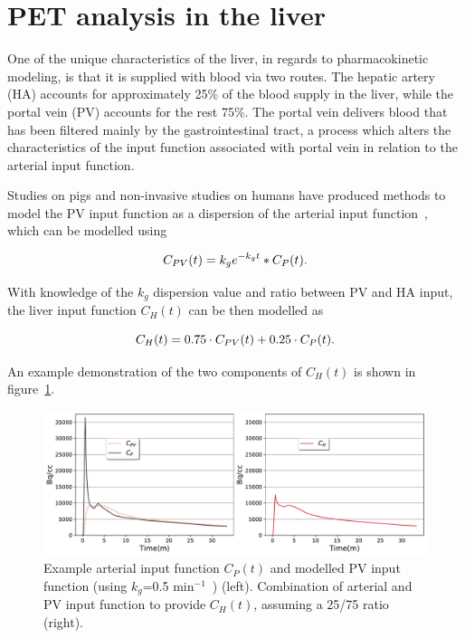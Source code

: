 \section{PET analysis in the liver}
\label{liver_PV_theory}
One of the unique characteristics of the liver, in regards to pharmacokinetic modeling, is that it is supplied with blood via two routes. The hepatic artery (HA) accounts for approximately 25\% of the blood supply in the liver, while the portal vein (PV) accounts for the rest 75\%. The portal vein delivers blood that has been filtered mainly by the gastrointestinal tract, a process which alters the characteristics of the input function associated with portal vein in relation to the arterial input function. 

Studies on pigs and non-invasive studies on humans have produced methods to model the PV input function as a dispersion of the arterial input function~\cite{Kudomi2008,Winterdahl2011}, which can be modelled using 

\begin{equation} 
{C_{PV}}(t)  = {k_g} e^{-k_g t} \ast C_P(t)   \\ . \\
\label{eqn:PortalVein}
\end{equation}

With knowledge of the $k_g$ dispersion value and ratio between PV and HA input, the liver input function ${C_{H}}(t)$ can be then modelled as

\begin{equation} 
{C_{H}}(t)  = 0.75 \cdot C_{PV}(t) + 0.25 \cdot C_{P}(t)  \\ . \\
\label{eqn:HepaticInput}
\end{equation}

An example demonstration of the two components of ${C_{H}}(t)$ is shown in figure~\ref{fig_2_2:LiverDualInputFunction}.

\begin{figure} [h!]
\centering
\includegraphics[scale=0.53,angle=0]{2_Theory_Methods/figures/2_2_LiverDualInputFunction.pdf}
\caption{Example arterial input function $C_{P}(t)$ and modelled PV input function (using $k_g$=0.5 min$^{-1}$~\cite{Kudomi2008}) (left). Combination of arterial and PV input function to provide ${C_{H}}(t)$, assuming a 25/75 ratio (right).} 
\label{fig_2_2:LiverDualInputFunction}
\end{figure} 


